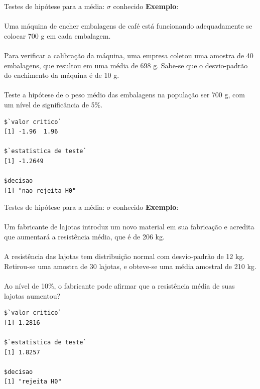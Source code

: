 \documentclass[10pt]{beamer}\usepackage[]{graphicx}\usepackage[]{color}
\makeatletter
\newenvironment{kframe}{%
 \def\at@end@of@kframe{}%
 \ifinner\ifhmode%
  \def\at@end@of@kframe{\end{minipage}}%
  \begin{minipage}{\columnwidth}%
 \fi\fi%
 \def\FrameCommand##1{\hskip\@totalleftmargin \hskip-\fboxsep
 \colorbox{shadecolor}{##1}\hskip-\fboxsep
     \hskip-\linewidth \hskip-\@totalleftmargin \hskip\columnwidth}%
 \MakeFramed {\advance\hsize-\width
   \@totalleftmargin\z@ \linewidth\hsize
   \@setminipage}}%
 {\par\unskip\endMakeFramed%
 \at@end@of@kframe}
\newenvironment{knitrout}{}{} %
\theoremstyle{definition}
\makeatother
\begin{document}
\begin{frame}[fragile]{Testes de hipótese para a média: $\sigma$ conhecido}
  \textbf{Exemplo}: \\~\\
  Uma máquina de encher embalagens de café está funcionando
  adequadamente se colocar 700 g em cada embalagem. \\~\\
  Para verificar a calibração da máquina, uma empresa coletou uma
  amostra de 40 embalagens, que resultou em uma média de 698 g. Sabe-se
  que o desvio-padrão do enchimento da máquina é de 10 g. \\~\\
  Teste a hipótese de o peso médio das embalagens na população ser 700
  g, com um nível de significância de 5\%.
  \pause
\begin{knitrout}\footnotesize
{}\color{fgcolor}\begin{kframe}
\begin{verbatim}
$`valor critico`
[1] -1.96  1.96

$`estatistica de teste`
[1] -1.2649

$decisao
[1] "nao rejeita H0"
\end{verbatim}
\end{kframe}
\end{knitrout}
\end{frame}

\begin{frame}[fragile]{Testes de hipótese para a média: $\sigma$ conhecido}
  \textbf{Exemplo}: \\~\\
  Um fabricante de lajotas introduz um novo material em sua fabricação e
  acredita que aumentará a resistência média, que é de 206
  kg. \\~\\
  A resistência das lajotas tem distribuição normal com desvio-padrão de
  12 kg. Retirou-se uma amostra de 30 lajotas, e
  obteve-se uma média amostral de 210 kg. \\~\\
  Ao nível de 10\%, o fabricante pode afirmar que a resistência média de
  suas lajotas aumentou?
  \pause
\begin{knitrout}\footnotesize
{}\color{fgcolor}\begin{kframe}
\begin{verbatim}
$`valor critico`
[1] 1.2816

$`estatistica de teste`
[1] 1.8257

$decisao
[1] "rejeita H0"
\end{verbatim}
\end{kframe}
\end{knitrout}
\end{frame}
\end{document}
